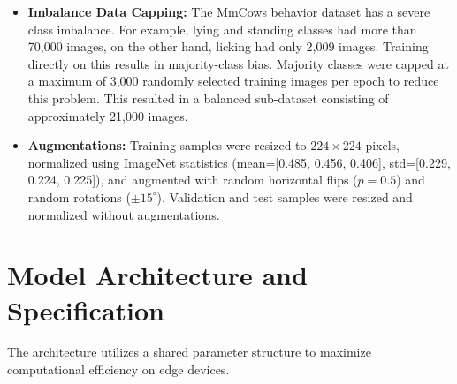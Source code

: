 \begin{itemize}
\begin{figure}[H]
    \caption{Sparse Temporal Sampling illustration. The video clip is divided into 20 equal temporal segments, and exactly the center frame of each segment is sampled to construct a standardized sequence tensor of shape $(20, 3, 224, 224)$.}
    \label{fig:temporal_sampling}
    \end{figure}
    \item \textbf{Imbalance Data Capping:} The MmCows behavior dataset has a severe class imbalance. For example, lying and standing classes had more than 70,000 images, on the other hand, licking had only 2,009 images. Training directly on this results in majority-class bias. Majority classes were capped at a maximum of 3,000 randomly selected training images per epoch to reduce this problem. This resulted in a balanced sub-dataset consisting of approximately 21,000 images.
    \item \textbf{Augmentations:} Training samples were resized to $224 \times 224$ pixels, normalized using ImageNet statistics (mean=[0.485, 0.456, 0.406], std=[0.229, 0.224, 0.225]), and augmented with random horizontal flips ($p=0.5$) and random rotations ($\pm 15^\circ$). Validation and test samples were resized and normalized without augmentations.
\end{itemize}

\section{Model Architecture and Specification}
The architecture utilizes a shared parameter structure to maximize computational efficiency on edge devices.

